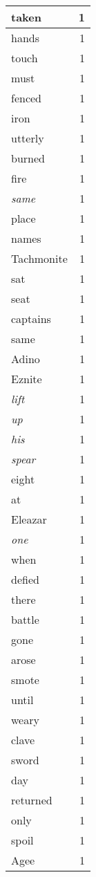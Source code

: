 \begin{center}
\begin{longtable}{l|r}
taken & 1 \\ \hline
hands & 1 \\ \hline
touch & 1 \\ \hline
must & 1 \\ \hline
fenced & 1 \\ \hline
iron & 1 \\ \hline
utterly & 1 \\ \hline
burned & 1 \\ \hline
fire & 1 \\ \hline
\emph{same} & 1 \\ \hline
place & 1 \\ \hline
names & 1 \\ \hline
Tachmonite & 1 \\ \hline
sat & 1 \\ \hline
seat & 1 \\ \hline
captains & 1 \\ \hline
same & 1 \\ \hline
Adino & 1 \\ \hline
Eznite & 1 \\ \hline
\emph{lift} & 1 \\ \hline
\emph{up} & 1 \\ \hline
\emph{his} & 1 \\ \hline
\emph{spear} & 1 \\ \hline
eight & 1 \\ \hline
at & 1 \\ \hline
Eleazar & 1 \\ \hline
\emph{one} & 1 \\ \hline
when & 1 \\ \hline
defied & 1 \\ \hline
there & 1 \\ \hline
battle & 1 \\ \hline
gone & 1 \\ \hline
arose & 1 \\ \hline
smote & 1 \\ \hline
until & 1 \\ \hline
weary & 1 \\ \hline
clave & 1 \\ \hline
sword & 1 \\ \hline
day & 1 \\ \hline
returned & 1 \\ \hline
only & 1 \\ \hline
spoil & 1 \\ \hline
Agee & 1 \\ \hline

\end{longtable}
\end{center}
